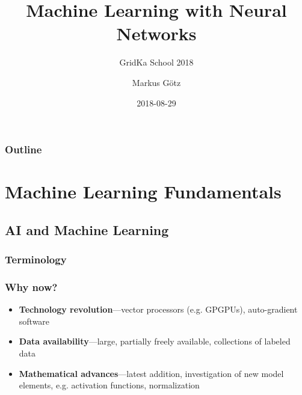\documentclass[aspectratio=1610]{beamer}
\title{Machine Learning with Neural Networks}
\subtitle{GridKa School 2018}
\author{Markus Götz}
\date{2018-08-29}
\institute{KIT}
\begin{document}
\maketitle

\begin{frame}
\frametitle{Outline}
    \tableofcontents[hideallsubsections]
\end{frame}

\section{Machine Learning Fundamentals}
\label{sec:machine-learning}

\subsection{AI and Machine Learning}
\label{subsec:terminology}

\begin{frame}
    \frametitle{Terminology}
    
    \begin{figure}
        \centering
    \end{figure}
\end{frame}

\begin{frame}
\frametitle{Why now?}
    \begin{itemize}
        \item \textbf{Technology revolution}---vector processors (e.g. GPGPUs), auto-gradient software
        \item \textbf{Data availability}---large, partially freely available, collections of labeled data
        \item \textbf{Mathematical advances}---latest addition, investigation of new model elements, e.g. activation functions, normalization
    \end{itemize}
\end{frame}
\end{document}
